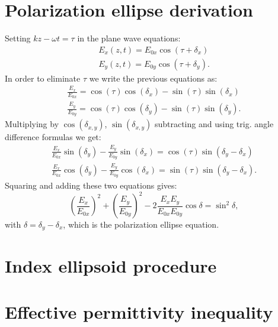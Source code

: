 \section{Polarization ellipse derivation}
\label{sec:deriv_pol_ellipse}
Setting $kz-\omega t=\tau$ in the plane wave equations:
\begin{equation}
\begin{aligned}
    E_x(z, t) = E_{0x}\cos(\tau + \delta_x) \\
    E_y(z, t) = E_{0y}\cos(\tau + \delta_y).
\end{aligned}
\end{equation}
In order to eliminate $\tau$ we write the previous equations as:
\begin{equation}
\begin{aligned}
    \frac{E_x}{E_{0x}} = \cos(\tau)\cos(\delta_x) - \sin(\tau)\sin(\delta_x)\\
    \frac{E_y}{E_{0y}} = \cos(\tau)\cos(\delta_y) - \sin(\tau)\sin(\delta_y).
\end{aligned}
\end{equation}
Multiplying by $\cos(\delta_{x,y})$, $\sin(\delta_{x,y})$ subtracting and using trig. angle difference formulas we get:
\begin{equation}
\begin{aligned}
    \frac{E_x}{E_{0x}}\sin(\delta_y) - \frac{E_y}{E_{0y}}\sin(\delta_x) = \cos(\tau)\sin(\delta_y-\delta_x)\\
    \frac{E_x}{E_{0x}}\cos(\delta_y) - \frac{E_y}{E_{0y}}\cos(\delta_x) = \sin(\tau)\sin(\delta_y-\delta_x).
\end{aligned}
\end{equation}
Squaring and adding these two equations gives:
\begin{equation}
    \left(\frac{E_x}{E_{0x}}\right)^2+\left(\frac{E_y}{E_{0y}}\right)^2-2\frac{E_x E_y}{E_{0x} E_{0y}}\cos \delta =\sin^2 \delta,
\end{equation}
with $\delta=\delta_y-\delta_x$, which is the polarization ellipse equation.

\section{Index ellipsoid procedure}
\label{sec:index_ellipse_proof}

\section{Effective permittivity inequality}
\label{sec:bf_proof}


